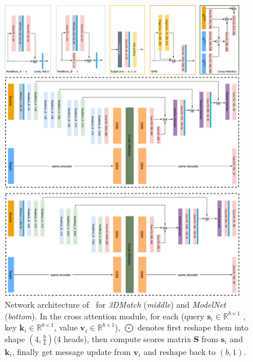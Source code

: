 \begin{figure}[t]
    \centering
    \includegraphics[width=0.95\textwidth]{figures/images/arch_sketch.pdf}
    \caption{Network architecture of \acro\ for \emph{3DMatch} (\textit{middle}) and \emph{ModelNet} (\textit{bottom}). In the cross attention module, for each (query $\mathbf{s}_i \in \mathbb{R}^{b\times1}$ , key $\mathbf{k}_i \in \mathbb{R}^{b\times1}$, value $\mathbf{v}_i \in \mathbb{R}^{b\times1}$), $\bigodot$ denotes first reshape them into shape $(4, \frac{b}{4})$(4 heads), then compute scores matrix $\mathbf{S}$ from $\mathbf{s}_i$ and $\mathbf{k}_i$, finally get message update from $\mathbf{v}_i$ and reshape back to $(b,1)$.}
    \label{fig:network_arch_detailed}
\end{figure}